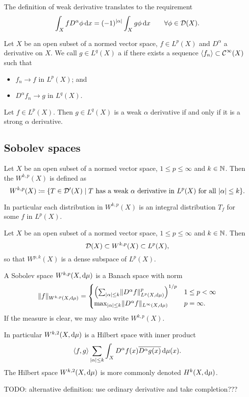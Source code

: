 The definition of weak derivative translates to the requirement
\[ \int_X f D^\alpha \phi \operatorname{d \!}{x} = (-1)^{|\alpha|}\int_X g\phi\operatorname{d \!}{x} \qquad \forall \phi\in\operatorname{\mathcal{D}}(X). \]

\begin{definition}
    Let $X$ be an open subset of a normed vector space, $f\in L^p(X)$ and $D^\alpha$ a derivative on $X$. We call $g\in L^q(X)$ a  if there exists a sequence $\left\langle f_n \right\rangle \subset \operatorname{\mathcal{C}}^\infty(X)$  such that
    \begin{itemize}
    \item $f_n \to f$ in $L^p(X)$; and
    \item $D^{\alpha}f_n \to g$ in $L^q(X)$.
    \end{itemize}
\end{definition}

\begin{theorem}
Let $f\in L^p(X)$. Then $g\in L^q(X)$ is a weak $\alpha$ derivative \textup{if and only if} it is a strong $\alpha$ derivative.
\end{theorem}

\subsection{Sobolev spaces}
\begin{definition}
Let $X$ be an open subset of a normed vector space, $1\leq p \leq \infty$ and $k\in\mathbb{N}$. Then the  $W^{k,p}(X)$ is defined as
\[ W^{k,p}(X) \defeq \setbuilder{T\in \dists(X)}{\text{$T$ has a weak $\alpha$ derivative in $L^p(X)$ for all $|\alpha|\leq k$}}.
 \]
\end{definition}
In particular each distribution in $W^{k,p}(X)$ is an integral distribution $T_f$ for some $f$ in $L^p(X)$.

\begin{lemma}
    Let $X$ be an open subset of a normed vector space, $1\leq p \leq \infty$ and $k\in\mathbb{N}$. Then
    \[ \operatorname{\mathcal{D}}(X) \subset W^{k,p}(X) \subset L^p(X), \]
    so that $W^{p,k}(X)$ is a dense subspace of $L^p(X)$.
\end{lemma}

\begin{proposition}
A Sobolev space $W^{k,p}(X,\operatorname{d \!}{\mu})$ is a Banach space with norm
\[ \lVert f\rVert_{W^{k,p}(X,\operatorname{d \!}{\mu})} = \begin{cases}
\left(\sum_{|\alpha|\leq k}\lVert D^\alpha f\rVert^p_{L^{p}(X, \operatorname{d \!}{\mu})}\right)^{1/p} & 1\leq p < \infty \\
\max_{|\alpha|\leq k} \lVert D^\alpha f\rVert_{L^{\infty}(X, \operatorname{d \!}{\mu})} & p = \infty.
\end{cases} \]
If the measure is clear, we may also write $W^{k,p}(X)$.

In particular $W^{k,2}(X, \operatorname{d \!}{\mu})$ is a Hilbert space with inner product
\[ \left\langle f,g \right\rangle \sum_{|\alpha| \leq k} \int_X D^\alpha f(x) \overline{D^\alpha g(x)}\operatorname{d \!}{\mu(x)}. \]
The Hilbert space $W^{k,2}(X, \operatorname{d \!}{\mu})$ is more commonly denoted $H^k(X, \operatorname{d \!}{\mu})$.
\end{proposition}
TODO: alternative definition: use ordinary derivative and take completion???

